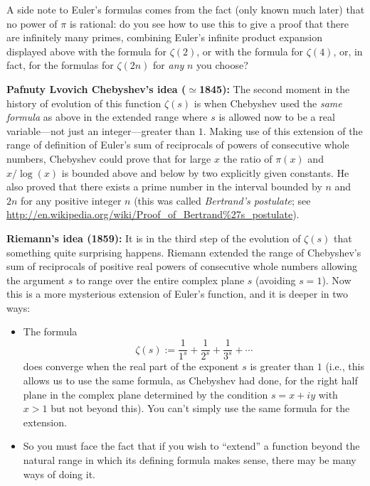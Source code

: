 \documentclass[openany]{book}
\theoremstyle{plain}
\theoremstyle{definition}
\begin{document}
{{  A side note to Euler's formulas comes from the fact (only known much
  later) that no power of $\pi$ is rational: do you see how to use
  this to give a proof that there are infinitely many primes,
  combining Euler's infinite product expansion displayed above with
  the formula for $\zeta(2)$, or with the formula for $\zeta(4)$, or,
  in fact, for the formulas for $\zeta(2n)$ for {\it any} $n$ you
  choose?

  {\bf Pafnuty Lvovich Chebyshev's idea ($\simeq$1845):} The second moment
  in the history of evolution of this function $\zeta(s)$ is when
  Chebyshev used the {\it same formula} as above in the extended range
  where $s$ is allowed now to be a real variable---not just an
  integer---greater than $1$.  Making use of this extension of the
  range of definition of Euler's sum of reciprocals of powers of
  consecutive whole numbers, Chebyshev could prove that for large $x$
  the ratio of $\pi(x)$ and $x/\log(x)$ is bounded above and below by
  two explicitly given constants. He also proved that there exists a
  prime number in the interval bounded by $n$ and $2n$ for any positive
  integer $n$ (this was called {\it Bertrand's postulate}; see \url{http://en.wikipedia.org/wiki/Proof_of_Bertrand%27s_postulate}).
  \vskip20pt

  {\bf Riemann's idea (1859):} It is in the third step of the
  evolution of $\zeta(s)$ that something quite surprising
  happens. Riemann extended the range of Chebyshev's sum of
  reciprocals of positive real powers of consecutive whole numbers
  allowing the argument $s$ to range over the entire complex plane $s$
  (avoiding $s=1$).  Now this is a more mysterious extension of
  Euler's function, and it is deeper in two ways:

\begin{itemize}
\item The formula $$\zeta(s):= {\frac{1}{1^s}}+ {\frac{1}{2^s}}+
  {\frac{1}{3^s}}+ \cdots$$ does converge when the real part of the
  exponent $s$ is greater than $1$ (i.e., this allows us to use the
  same formula, as Chebyshev had done, for the right half plane
  in the complex plane determined by the condition $s=x+iy$ with $x>1$
  but not beyond this).  You can't simply use the same formula for the
  extension.\item So you must face the fact that if you wish to
  ``extend'' a function beyond the natural range in which its defining
  formula makes sense, there may be many ways of doing it.
\end{itemize}

}}
\end{document}
